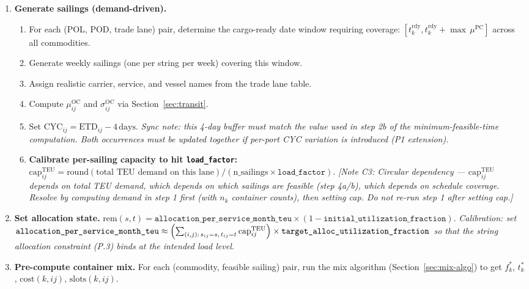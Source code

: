 \documentclass[11pt,a4paper]{article}
\theoremstyle{definition}
\begin{document}
\begin{enumerate}
  \item \textbf{Generate sailings (demand-driven).}
    \begin{enumerate}[noitemsep]
      \item For each (POL, POD, trade lane) pair, determine the cargo-ready date window
            requiring coverage: $[t_k^{\text{rdy}}, t_k^{\text{rdy}} + \max\,\mu^{\text{PC}}]$ across all commodities.
      \item Generate weekly sailings (one per string per week) covering this window.
      \item Assign realistic carrier, service, and vessel names from the trade lane table.
      \item Compute $\mu_{ij}^{\text{OC}}$ and $\sigma_{ij}^{\text{OC}}$ via Section~\ref{sec:transit}.
      \item Set $\text{CYC}_{ij} = \text{ETD}_{ij} - 4\,\text{days}$.
            \textit{Sync note: this 4-day buffer must match the value used in step 2b of the
            minimum-feasible-time computation. Both occurrences must be updated together if
            per-port CYC variation is introduced (P1 extension).}
      \item \textbf{Calibrate per-sailing capacity to hit \texttt{load\_factor}:}
            $\text{cap}_{ij}^{\text{TEU}} = \text{round}(\text{total TEU demand on this lane}) /
            (\text{n\_sailings} \times \texttt{load\_factor})$.
            \textit{[Note C3: Circular dependency --- $\text{cap}_{ij}^{\text{TEU}}$ depends on
            total TEU demand, which depends on which sailings are feasible (step 4a/b), which
            depends on schedule coverage. Resolve by computing demand in step 1 first (with
            $n_k$ container counts), then setting cap. Do not re-run step 1 after setting cap.]}
    \end{enumerate}

  \item \textbf{Set allocation state.}
    $\text{rem}(s, t) = \texttt{allocation\_per\_service\_month\_teu}
    \times (1 - \texttt{initial\_utilization\_fraction})$.
    \textit{Calibration: set
    $\texttt{allocation\_per\_service\_month\_teu} \approx
    \Bigl(\sum_{(i,j):\, s_{ij}=s,\, t_{ij}=t} \text{cap}_{ij}^{\text{TEU}}\Bigr)
    \times \texttt{target\_alloc\_utilization\_fraction}$
    so that the string allocation constraint (P.3) binds at the intended load level.}

  \item \textbf{Pre-compute container mix.} For each (commodity, feasible sailing) pair, run
    the mix algorithm (Section~\ref{sec:mix-algo}) to get $f_k^*$, $t_k^*$, $\text{cost}(k,ij)$,
    $\text{slots}(k,ij)$.


\end{enumerate}
\end{document}
